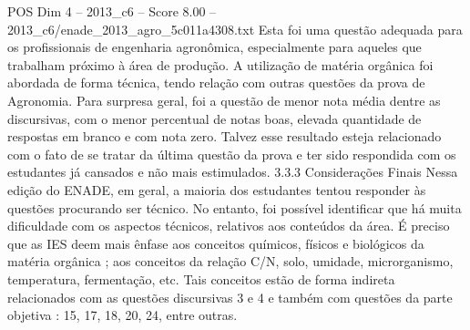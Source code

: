 \begin{textsample}{POS Dim 4 – 2013\_c6 – Score 8.00 – 2013\_c6/enade\_2013\_agro\_5c011a4308.txt}
Esta foi uma questão adequada para os profissionais de engenharia agronômica, especialmente para aqueles que trabalham próximo à área de produção.
A utilização de matéria orgânica foi abordada de forma técnica, tendo relação com outras questões da prova de Agronomia.
Para surpresa geral, foi a questão de menor nota média dentre as discursivas, com o menor percentual de notas boas, elevada quantidade de respostas em branco e com nota zero.
Talvez esse resultado esteja relacionado com o fato de se tratar da última questão da prova e ter sido respondida com os estudantes já cansados e não mais estimulados. 3.3.3 Considerações Finais Nessa edição do ENADE, em geral, a maioria dos estudantes tentou responder às questões procurando ser técnico.
No entanto, foi possível identificar que há muita dificuldade com os aspectos técnicos, relativos aos conteúdos da área.
É preciso que as IES deem mais ênfase aos conceitos químicos, físicos e biológicos da matéria orgânica ; aos conceitos da relação C/N, solo, umidade, microrganismo, temperatura, fermentação, etc.
Tais conceitos estão de forma indireta relacionados com as questões discursivas 3 e 4 e também com questões da parte objetiva : 15, 17, 18, 20, 24, entre outras.

\end{textsample}
